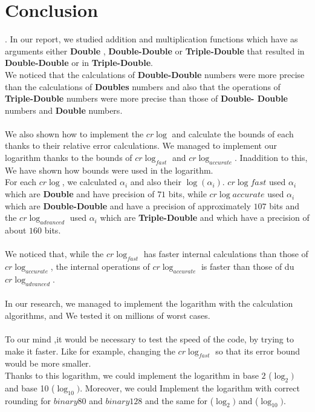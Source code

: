 \chapter*{Conclusion}
.
In our report, we studied addition and multiplication functions which have as arguments either \textbf{Double} , \textbf{Double-Double} or \textbf{Triple-Double} that resulted in \textbf{Double-Double} or in \textbf{Triple-Double}.\\
We noticed that the calculations of \textbf{Double-Double} numbers were more precise than the calculations of \textbf{Doubles} numbers and also that the operations of \textbf{Triple-Double} numbers were more precise than those of \textbf{Double- Double} numbers and \textbf{Double} numbers.\\
\ \\
We also shown how to implement the $cr\log$ and calculate the bounds of each thanks to their relative error calculations. We managed to implement our logarithm thanks to the bounds of $cr\log_{fast}$ and $cr\log_{accurate}$. Inaddition to this, We have shown how bounds were used in the logarithm.\\
For each $cr\log$, we calculated $\alpha_i$ and also their $\log(\alpha_i)$. $cr\log{fast}$ used $\alpha_i$ which are \textbf{Double} and have precision of $71$ bits, while $cr\log{accurate}$ used $\alpha_i $ which are \textbf{Double-Double} and have a precision of approximately $107$ bits and the $cr\log_{advanced}$ used $\alpha_i$ which are \textbf{Triple-Double} and which have a precision of about $160$ bits.\\
\ \\
We noticed that, while the $cr\log_{fast}$ has faster internal calculations than those of $cr\log_{accurate}$, the internal operations of $cr\log_{accurate}$ is faster than those of du $cr\log_{advanced}$.\\
\ \\
In our research, we managed to implement the logarithm with the calculation algorithms, and We tested it on millions of worst cases. \\
\ \\
To our mind ,it would be necessary to test the speed of the code, by trying to make it faster. Like for example, changing the $cr\log_{fast}$ so that its error bound would be more smaller. \\
Thanks to this logarithm, we could implement the logarithm in base $2$ ($\log_2)$ and base 10 ($\log_{10})$.
Moreover, we could Implement the logarithm with correct rounding for $binary80$ and $binary128$ and the same for ($\log_2)$ and ($\log_{10})$.\\